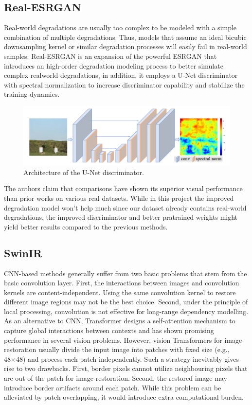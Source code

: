 \subsection{Real-ESRGAN}
\label{subsec:realesrgan}

Real-world degradations are usually too complex to be modeled with a simple combination of multiple degradations. Thus, models that assume an ideal bicubic
downsampling kernel or similar degradation processes will easily fail in real-world samples. Real-ESRGAN\cite{9711325} is an expansion of the powerful ESRGAN that introduces an high-order degradation modeling process to better simulate complex realworld degradations, in addition,
it employs a U-Net discriminator with spectral normalization to increase discriminator capability and stabilize the training dynamics.

\begin{figure}[H]
  \centering
  \includegraphics[scale=0.4]{figures/UNET.png}
  \caption{Architecture of the U-Net discriminator.}
  \label{img:UNET}
\end{figure}

The authors claim that comparisons have shown its superior visual performance than prior works on various real datasets. While in this project the improved degradation model won't help much since our dataset already contains real-world degradations, the improved discriminator and better pratrained weights might yield better results compared to the previous methods.

\subsection{SwinIR}
\label{subsec:swinir}

CNN-based methods generally suffer from two basic
problems that stem from the basic convolution layer. First, the interactions between images and convolution kernels are content-independent. Using the same convolution kernel to restore different image regions may not be the best choice. Second, under the principle of local processing, convolution is not effective for long-range dependency modelling. As an alternative to CNN, Transformer designs a self-attention mechanism to capture global interactions between contexts and has shown promising performance in several vision problems. However, vision Transformers for image restoration usually divide the input image into patches with fixed size (e.g., 48×48) and process each patch independently. Such a strategy inevitably gives rise to two drawbacks. First, border pixels cannot utilize neighbouring pixels that are out of the patch for image restoration. Second, the restored image may introduce border artifacts around each patch. While this problem can be alleviated by patch overlapping, it would introduce extra computational burden.

